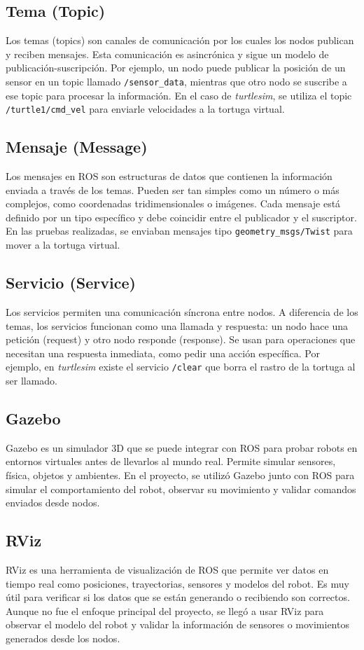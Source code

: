 \subsection{Tema (Topic)}
Los temas (topics) son canales de comunicación por los cuales los nodos publican y reciben mensajes. Esta comunicación es asincrónica y sigue un modelo de publicación-suscripción. Por ejemplo, un nodo puede publicar la posición de un sensor en un topic llamado \texttt{/sensor\_data}, mientras que otro nodo se suscribe a ese topic para procesar la información. En el caso de \textit{turtlesim}, se utiliza el topic \texttt{/turtle1/cmd\_vel} para enviarle velocidades a la tortuga virtual.

\subsection{Mensaje (Message)}
Los mensajes en ROS son estructuras de datos que contienen la información enviada a través de los temas. Pueden ser tan simples como un número o más complejos, como coordenadas tridimensionales o imágenes. Cada mensaje está definido por un tipo específico y debe coincidir entre el publicador y el suscriptor. En las pruebas realizadas, se enviaban mensajes tipo \texttt{geometry\_msgs/Twist} para mover a la tortuga virtual.

\subsection{Servicio (Service)}
Los servicios permiten una comunicación síncrona entre nodos. A diferencia de los temas, los servicios funcionan como una llamada y respuesta: un nodo hace una petición (request) y otro nodo responde (response). Se usan para operaciones que necesitan una respuesta inmediata, como pedir una acción específica. Por ejemplo, en \textit{turtlesim} existe el servicio \texttt{/clear} que borra el rastro de la tortuga al ser llamado.

\subsection{Gazebo}
Gazebo es un simulador 3D que se puede integrar con ROS para probar robots en entornos virtuales antes de llevarlos al mundo real. Permite simular sensores, física, objetos y ambientes. En el proyecto, se utilizó Gazebo junto con ROS para simular el comportamiento del robot, observar su movimiento y validar comandos enviados desde nodos. 

\subsection{RViz}
RViz es una herramienta de visualización de ROS que permite ver datos en tiempo real como posiciones, trayectorias, sensores y modelos del robot. Es muy útil para verificar si los datos que se están generando o recibiendo son correctos. Aunque no fue el enfoque principal del proyecto, se llegó a usar RViz para observar el modelo del robot y validar la información de sensores o movimientos generados desde los nodos.
